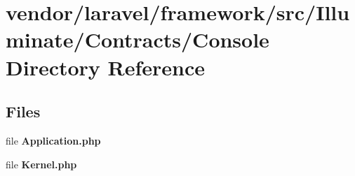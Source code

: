 \section{vendor/laravel/framework/src/\+Illuminate/\+Contracts/\+Console Directory Reference}
\label{dir_f4010db758dc13c13f7045a5bbf83fba}
\subsection*{Files}
\begin{DoxyCompactItemize}
\item 
file {\bf Application.\+php}
\item 
file {\bf Kernel.\+php}
\end{DoxyCompactItemize}
